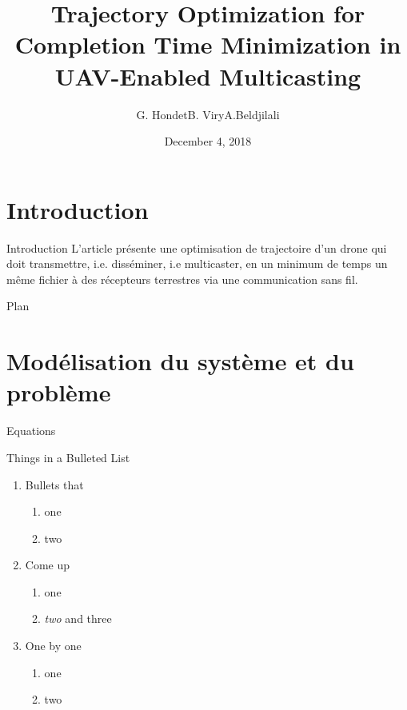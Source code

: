 \documentclass[utf8, a4paper]{beamer}
\title
  [Optimisation de trajectoire et du temps de mission d'un drone de télécommunication multicast.]
  {Trajectory Optimization for Completion Time Minimization in UAV-Enabled Multicasting}
\author
  [Toto]
  {G. Hondet\quad B. Viry\quad A.Beldjilali }
\date
  {December 4, 2018}
\institute
  {ENAC}
\begin{document}
\maketitle



\section {Introduction}

\begin{frame}
  {Introduction}
  L'article présente une optimisation de trajectoire d'un drone qui doit transmettre, i.e. disséminer, i.e multicaster,
  en un minimum de temps un même fichier à des récepteurs terrestres via une communication sans fil.

\end{frame}

\begin{frame}{Plan}
 \tableofcontents
\end{frame}

\section{Modélisation du système et du problème}

\begin{frame}{Equations}

 Things in a Bulleted List\pause

\begin{enumerate}
	\item Bullets that
	\begin{enumerate}
		\item one
		\item two
	\end{enumerate}\pause
	\item Come up
	\begin{enumerate}
		\item one
		\item \emph{two} and three
	\end{enumerate}\pause
	\item One by one
	\begin{enumerate}
		\item one
		\item two
	\end{enumerate}
\end{enumerate}
\end{frame}
\end{document}
